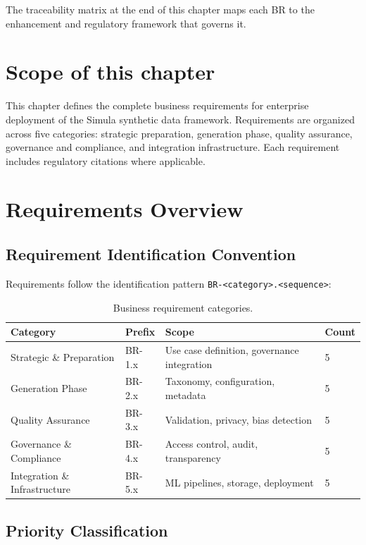\documentclass[12pt,a4paper,twoside]{report}
\begin{document}
\noindent
The traceability matrix at the end of this chapter maps each BR to the enhancement
and regulatory framework that governs it.

\section*{Scope of this chapter}

This chapter defines the complete business requirements for enterprise deployment
of the Simula synthetic data framework. Requirements are organized across five
categories: strategic preparation, generation phase, quality assurance, governance
and compliance, and integration infrastructure. Each requirement includes regulatory
citations where applicable.

\section{Requirements Overview}

\subsection{Requirement Identification Convention}

Requirements follow the identification pattern \texttt{BR-<category>.<sequence>}:

\begin{table}[htbp]
\centering
\caption{Business requirement categories.}
\label{tab:br-categories}
\footnotesize
\begin{tabularx}{\textwidth}{@{}l l X l@{}}
\toprule
\textbf{Category} & \textbf{Prefix} & \textbf{Scope} & \textbf{Count} \\
\midrule
Strategic \& Preparation & BR-1.x & Use case definition, governance integration & 5 \\
Generation Phase & BR-2.x & Taxonomy, configuration, metadata & 5 \\
Quality Assurance & BR-3.x & Validation, privacy, bias detection & 5 \\
Governance \& Compliance & BR-4.x & Access control, audit, transparency & 5 \\
Integration \& Infrastructure & BR-5.x & ML pipelines, storage, deployment & 5 \\
\bottomrule
\end{tabularx}
\end{table}

\subsection{Priority Classification}
\end{document}
